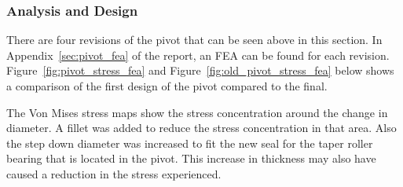 \subsubsection{Analysis and Design}

There are four revisions of the pivot that can be seen above in this section. In Appendix~\ref{sec:pivot_fea} of the report, an FEA can be found for each revision. Figure~\ref{fig:pivot_stress_fea} and Figure~\ref{fig:old_pivot_stress_fea} below shows a comparison of the first design of the pivot compared to the final.

%

The Von Mises stress maps show the stress concentration around the change in diameter. A fillet was added to reduce the stress concentration in that area. Also the step down diameter was increased to fit the new seal for the taper roller bearing that is located in the pivot. This increase in thickness may also have caused a reduction in the stress experienced.


